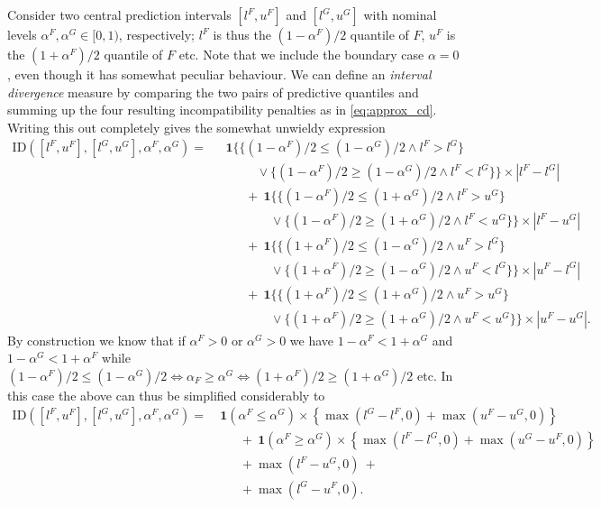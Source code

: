\documentclass[
]{article}
\begin{document}
Consider two central prediction intervals \([l^F, u^F]\) and
\([l^G, u^G]\) with nominal levels \(\alpha^F, \alpha^G \in [0, 1)\),
respectively; \(l^F\) is thus the \((1 - \alpha^F)/2\) quantile of
\(F\), \(u^F\) is the \((1 + \alpha^F)/2\) quantile of \(F\) etc. Note
that we include the boundary case \(\alpha = 0\), even though it has
somewhat peculiar behaviour. We can define an
\textit{interval divergence} measure by comparing the two pairs of
predictive quantiles and summing up the four resulting incompatibility
penalties as in \eqref{eq:approx_cd}. Writing this out completely gives
the somewhat unwieldy expression \begin{align*}
\text{ID}([l^F, u^F], [l^G, u^G], \alpha^F, \alpha^G) = & \ \ \ \mathbf{1}\big\{\{(1 - \alpha^F)/2 \leq (1 - \alpha^G)/2 \land l^F > l^G\big\} \\
& \ \ \ \ \ \ \ \ \ \ \ \ \ \ \lor \{(1 - \alpha^F)/2 \geq (1 - \alpha^G)/2 \land l^F < l^G\}\} \times |l^F - l^G|\\
& \ \ \ \ \ \ \ \ \ \ + \ \mathbf{1}\big\{\{(1 - \alpha^F)/2 \leq (1 + \alpha^G)/2 \land l^F > u^G\big\} \\
& \ \ \ \ \ \ \ \ \ \ \ \ \ \ \ \ \ \ \ \lor \{(1 - \alpha^F)/2 \geq (1 + \alpha^G)/2 \land l^F < u^G\}\} \times |l^F - u^G|\\
& \ \ \ \ \ \ \ \ \ \ + \ \mathbf{1}\big\{\{(1 + \alpha^F)/2 \leq (1 - \alpha^G)/2 \land u^F > l^G\big\} \\
& \ \ \ \ \ \ \ \ \ \ \ \ \ \ \ \ \ \ \ \lor \{(1 + \alpha^F)/2 \geq (1 - \alpha^G)/2 \land u^F < l^G\}\} \times |u^F - l^G|\\
& \ \ \ \ \ \ \ \ \ \ + \ \mathbf{1}\big\{\{(1 + \alpha^F)/2 \leq (1 + \alpha^G)/2 \land u^F > u^G\big\} \\
& \ \ \ \ \ \ \ \ \ \ \ \ \ \ \ \ \ \ \ \lor \{(1 + \alpha^F)/2 \geq (1 + \alpha^G)/2 \land u^F < u^G\}\} \times |u^F - u^G|.
\end{align*} By construction we know that if \(\alpha^F > 0\) or
\(\alpha^G > 0\) we have \(1 - \alpha^F < 1 + \alpha^G\) and
\(1 - \alpha^G < 1 + \alpha^F\) while
\((1 - \alpha^F)/2 \leq (1 - \alpha^G)/2 \Leftrightarrow \alpha_F \geq \alpha^G \Leftrightarrow (1 + \alpha^F)/2 \geq (1 + \alpha^G)/2\)
etc. In this case the above can thus be simplified considerably to
\begin{align*}
\text{ID}([l^F, u^F], [l^G, u^G], \alpha^F, \alpha^G) = & \ \mathbf{1}(\alpha^F \leq \alpha^G)\times\left\{\max(l^G - l^F, 0) + \max(u^F - u^G, 0)\right\} \\
& \ \ \ \ \ \ \ \ + \ \mathbf{1}(\alpha^F \geq \alpha^G) \times \left\{\max(l^F - l^G, 0) + \max(u^G - u^F, 0)\right\} \\
& \ \ \ \ \ \ \ \ + \max(l^F - u^G, 0) \ +\\
& \ \ \ \ \ \ \ \ + \max(l^G - u^F, 0).
\end{align*}
\end{document}
